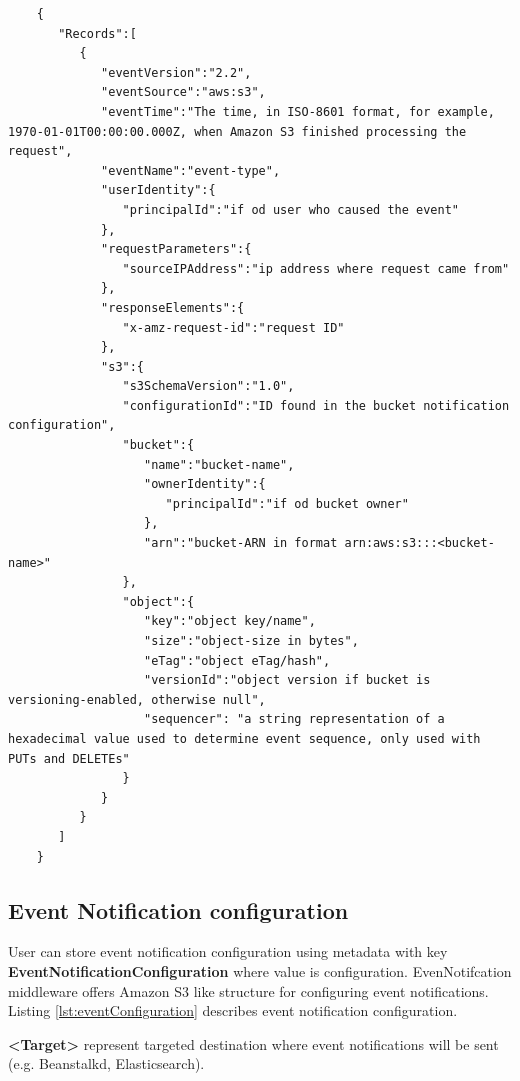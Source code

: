     \begin{lstlisting}
    {
       "Records":[
          {
             "eventVersion":"2.2",
             "eventSource":"aws:s3",
             "eventTime":"The time, in ISO-8601 format, for example, 1970-01-01T00:00:00.000Z, when Amazon S3 finished processing the request",
             "eventName":"event-type",
             "userIdentity":{
                "principalId":"if od user who caused the event"
             },
             "requestParameters":{
                "sourceIPAddress":"ip address where request came from"
             },
             "responseElements":{
                "x-amz-request-id":"request ID"
             },
             "s3":{
                "s3SchemaVersion":"1.0",
                "configurationId":"ID found in the bucket notification configuration",
                "bucket":{
                   "name":"bucket-name",
                   "ownerIdentity":{
                      "principalId":"if od bucket owner"
                   },
                   "arn":"bucket-ARN in format arn:aws:s3:::<bucket-name>"
                },
                "object":{
                   "key":"object key/name",
                   "size":"object-size in bytes",
                   "eTag":"object eTag/hash",
                   "versionId":"object version if bucket is versioning-enabled, otherwise null",
                   "sequencer": "a string representation of a hexadecimal value used to determine event sequence, only used with PUTs and DELETEs"
                }
             }
          }
       ]
    }
    \end{lstlisting}

    \subsection{Event Notification configuration}
    User can store event notification configuration using metadata with key \textbf{EventNotificationConfiguration} where value is configuration.
    EvenNotifcation middleware offers Amazon S3 like structure for configuring event notifications.
    Listing \ref{lst:eventConfiguration} describes event notification configuration.

    \textbf{<Target>} represent targeted destination where event notifications will be sent (e.g. Beanstalkd, Elasticsearch).

